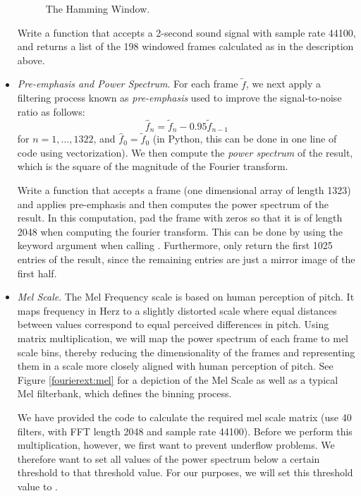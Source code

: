 \begin{itemize}
\begin{figure}
\caption{The Hamming Window.}
\label{fourierext:ham}
\end{figure}

\begin{problem}
Write a function  that accepts a 2-second sound signal with sample rate 44100, and
returns a list of the 198 windowed frames calculated as in the description above.
\end{problem}

\item \emph{Pre-emphasis and Power Spectrum}. For each frame $\tilde{f}$, we next apply
a filtering process known as \emph{pre-emphasis} used to improve the signal-to-noise ratio as follows:
\begin{equation*}
\widehat{f}_{n} = \tilde{f}_{n} - 0.95 \tilde{f}_{n-1}
\end{equation*}
for $n = 1,\ldots,1322$, and $\widehat{f}_0 = \tilde{f}_0$ (in Python, this can be done in one line of code using vectorization).
We then compute the \emph{power spectrum} of the result, which is the square of the magnitude of the Fourier transform.

\begin{problem}
Write a function  that accepts a frame (one dimensional array of length 1323) and
applies pre-emphasis and then computes the power spectrum of the result.
In this computation, pad the frame with zeros so that it is of length 2048 when computing the fourier transform.
This can be done by using the keyword argument  when calling .
Furthermore, only return the first 1025 entries of the result, since the remaining entries are just a mirror image of the first half.
\end{problem}

\item \emph{Mel Scale}. The Mel Frequency scale is based on human perception of pitch.
It maps frequency in Herz to a slightly distorted scale where equal distances between values correspond to equal perceived differences in pitch.
Using matrix multiplication, we will map the power spectrum of each frame to mel scale bins, thereby reducing the dimensionality of the frames and representing them in a scale more closely aligned with human perception of pitch.
See Figure \ref{fourierext:mel} for a depiction of the Mel Scale as well as a typical Mel filterbank, which defines the binning process.

We have provided the code to calculate the required mel scale matrix (use 40 filters, with FFT length 2048 and sample rate 44100).
Before we perform this multiplication, however, we first want to prevent underflow problems.
We therefore want to set all values of the power spectrum below a certain threshold to that threshold value.
For our purposes, we will set this threshold value to .


\end{itemize}
